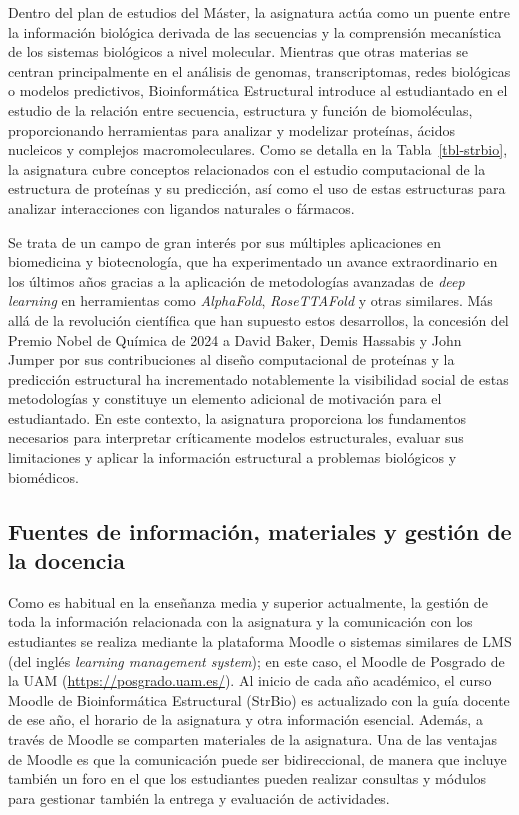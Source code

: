 \documentclass[
  11pt,
  a4paper,
  twoside]{scrreprt}
\begin{document}
Dentro del plan de estudios del Máster, la asignatura actúa como un
puente entre la información biológica derivada de las secuencias y la
comprensión mecanística de los sistemas biológicos a nivel molecular.
Mientras que otras materias se centran principalmente en el análisis de
genomas, transcriptomas, redes biológicas o modelos predictivos,
Bioinformática Estructural introduce al estudiantado en el estudio de la
relación entre secuencia, estructura y función de biomoléculas,
proporcionando herramientas para analizar y modelizar proteínas, ácidos
nucleicos y complejos macromoleculares. Como se detalla en la
Tabla~\ref{tbl-strbio}, la asignatura cubre conceptos relacionados con
el estudio computacional de la estructura de proteínas y su predicción,
así como el uso de estas estructuras para analizar interacciones con
ligandos naturales o fármacos.

Se trata de un campo de gran interés por sus múltiples aplicaciones en
biomedicina y biotecnología, que ha experimentado un avance
extraordinario en los últimos años gracias a la aplicación de
metodologías avanzadas de \emph{deep learning} en herramientas como
\emph{AlphaFold}, \emph{RoseTTAFold} y otras similares. Más allá de la
revolución científica que han supuesto estos desarrollos, la concesión
del Premio Nobel de Química de 2024 a David Baker, Demis Hassabis y John
Jumper por sus contribuciones al diseño computacional de proteínas y la
predicción estructural ha incrementado notablemente la visibilidad
social de estas metodologías y constituye un elemento adicional de
motivación para el estudiantado. En este contexto, la asignatura
proporciona los fundamentos necesarios para interpretar críticamente
modelos estructurales, evaluar sus limitaciones y aplicar la información
estructural a problemas biológicos y biomédicos.

\subsection{Fuentes de información, materiales y gestión de la
docencia}\label{fuentes-de-informaciuxf3n-materiales-y-gestiuxf3n-de-la-docencia}

Como es habitual en la enseñanza media y superior actualmente, la
gestión de toda la información relacionada con la asignatura y la
comunicación con los estudiantes se realiza mediante la plataforma
Moodle o sistemas similares de LMS (del inglés \emph{learning management
system}); en este caso, el Moodle de Posgrado de la UAM
(\url{https://posgrado.uam.es/}). Al inicio de cada año académico, el
curso Moodle de Bioinformática Estructural (StrBio) es actualizado con
la guía docente de ese año, el horario de la asignatura y otra
información esencial. Además, a través de Moodle se comparten materiales
de la asignatura. Una de las ventajas de Moodle es que la comunicación
puede ser bidireccional, de manera que incluye también un foro en el que
los estudiantes pueden realizar consultas y módulos para gestionar
también la entrega y evaluación de actividades.
\end{document}
